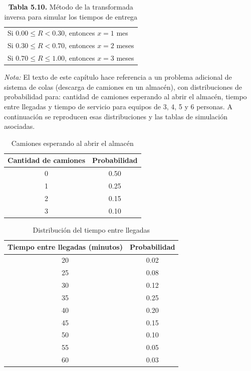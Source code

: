 \documentclass[11pt,letterpaper]{report}
\begin{document}
\begin{table}[H]
\centering
\caption*{\textbf{Tabla 5.10.} Método de la transformada inversa para simular los tiempos de entrega}
\begin{tabular}{l}
Si $0.00 \le R < 0.30$, entonces $x=1$ mes \\
Si $0.30 \le R < 0.70$, entonces $x=2$ meses \\
Si $0.70 \le R \le 1.00$, entonces $x=3$ meses \\
\end{tabular}
\end{table}

\bigskip
\noindent\emph{Nota:} El texto de este capítulo hace referencia a un
problema adicional de sistema de colas (descarga de camiones en un almacén),
con distribuciones de probabilidad para: cantidad de camiones esperando al
abrir el almacén, tiempo entre llegadas y tiempo de servicio para equipos de
3, 4, 5 y 6 personas. A continuación se reproducen esas distribuciones y las
tablas de simulación asociadas.

\begin{table}[H]
\centering
\caption*{Camiones esperando al abrir el almacén}
\begin{tabular}{cc}
\toprule
Cantidad de camiones & Probabilidad \\
\midrule
0 & 0.50 \\
1 & 0.25 \\
2 & 0.15 \\
3 & 0.10 \\
\bottomrule
\end{tabular}
\end{table}

\begin{table}[H]
\centering
\caption*{Distribución del tiempo entre llegadas}
\begin{tabular}{cc}
\toprule
Tiempo entre llegadas (minutos) & Probabilidad \\
\midrule
20 & 0.02 \\
25 & 0.08 \\
30 & 0.12 \\
35 & 0.25 \\
40 & 0.20 \\
45 & 0.15 \\
50 & 0.10 \\
55 & 0.05 \\
60 & 0.03 \\
\bottomrule
\end{tabular}
\end{table}
\end{document}

